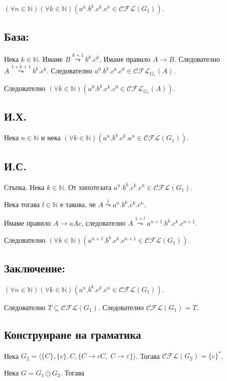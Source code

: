 \documentclass[12pt]{article}
\begin{document}
\((\forall n \in \mathbb{N})(\forall k \in \mathbb{N})(a^n.b^k.c^k.c^n \in \mathcal{CFL}(G_1))\).

\subsection*{База:}
Нека \(k \in \mathbb{N}\). Имаме \(B \overset{k + 1}{\leadsto} b^k.c^k\).
Имаме правило \(A \to B\). Следователно \(A \overset{1 + k + 1}{\leadsto} b^k.c^k\).
Следователно \(a^0.b^k.c^k.c^0 \in \mathcal{CFL}_{G_1}(A)\).

Следователно \((\forall k \in \mathbb{N})(a^0.b^k.c^k.c^0 \in \mathcal{CFL}_{G_1}(A))\).

\subsection*{И.Х.}
Нека \(n \in \mathbb{N}\) и нека \((\forall k \in \mathbb{N})(a^n.b^k.c^k.a^n \in \mathcal{CFL}(G_1))\).

\subsection*{И.С.}
Стъпка. Нека \(k \in \mathbb{N}\). От хипотезата \(a^n.b^k.c^k.c^n \in \mathcal{CFL}(G_1)\).

Нека тогава \(l \in \mathbb{N}\) е такова, че \(A \overset{l}{\leadsto} a^n.b^k.c^k.c^n\).

Имаме правило \(A \to aAc\), следователно \(A \overset{1 + l}{\leadsto} a^{n + 1}.b^k.c^k.c^{n + 1}\).

Следователно \((\forall k \in \mathbb{N})(a^{n + 1}.b^k.c^k.c^{n + 1} \in \mathcal{CFL}(G_1))\).

\subsection*{Заключение:}
\((\forall n \in \mathbb{N})(\forall k \in \mathbb{N})(a^n.b^k.c^k.c^n \in \mathcal{CFL}(G_1))\).

Следователно \(T \subseteq \mathcal{CFL}(G_1)\). Следователно \(\mathcal{CFL}(G_1) = T\).

\subsection*{Конструиране на граматика}
Нека \(G_2 = \langle \{C\}, \{c\},  C, \{C \to cC,\; C \to \varepsilon\} \rangle\).
Тогава \(\mathcal{CFL}(G_2) = \{c\}^*\).

Нека \(G = G_1 \odot G_2\).
Тогава
\end{document}
